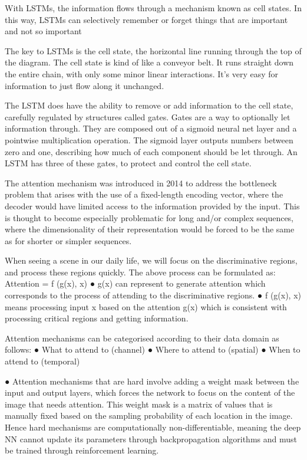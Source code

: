 With LSTMs, the information flows through a mechanism known as cell states.
In this way, LSTMs can selectively remember or forget things that are
important and not so important

The key to LSTMs is the cell state, the horizontal line running through the top
of the diagram.
The cell state is kind of like a conveyor belt. It runs straight down the entire
chain, with only some minor linear interactions. It’s very easy for information
to just flow along it unchanged.

The LSTM does have the ability to remove or add information to the cell
state, carefully regulated by structures called gates.
Gates are a way to optionally let information through. They are composed out
of a sigmoid neural net layer and a pointwise multiplication operation.
The sigmoid layer outputs numbers between
zero and one, describing how much of each
component should be let through.
An LSTM has three of these gates, to protect
and control the cell state.

The attention mechanism was introduced in 2014 to address the bottleneck
problem that arises with the use of a fixed-length encoding vector, where the
decoder would have limited access to the information provided by the input.
This is thought to become especially problematic for long and/or complex
sequences, where the dimensionality of their representation would be forced to
be the same as for shorter or simpler sequences.

When seeing a scene in our daily life, we will focus on the discriminative
regions, and process these regions quickly.
The above process can be formulated as:
Attention = f (g(x), x)
● g(x) can represent to generate attention which corresponds to the
process of attending to the discriminative regions.
● f (g(x), x) means processing input x based on the attention g(x) which
is consistent with processing critical regions and getting information.

Attention mechanisms can be categorised according to their data domain as
follows:
● What to attend to (channel)
● Where to attend to (spatial)
● When to attend to (temporal)

● Attention mechanisms that are hard involve adding a weight mask
between the input and output layers, which forces the network to focus on
the content of the image that needs attention.
This weight mask is a matrix of values that is manually fixed based on the
sampling probability of each location in the image.
Hence hard mechanisms are computationally non-differentiable, meaning
the deep NN cannot update its parameters through backpropagation
algorithms and must be trained through reinforcement learning.

